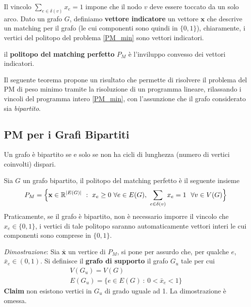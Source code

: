\documentclass[10pt, letterpaper]{report}
\newcommand{\x}{{\mathbf{x}}}
\begin{document}
Il vincolo $\sum_{e\in\delta(v)}x_e=1$ impone che il nodo $v$ deve essere toccato da un solo arco. Dato un grafo $G$, definiamo \textbf{vettore indicatore} un vettore $\x$ che descrive un matching per il grafo (le cui componenti sono quindi in $\{0,1\}$), chiaramente, i vertici del politopo del problema \ref{PM_min} sono vettori indicatori.
\begin{definizione}
    il \textbf{politopo del matching perfetto} $P_M$ è l'inviluppo convesso dei vettori indicatori.
\end{definizione}
Il seguente teorema propone un risultato che permette di risolvere il problema del PM di peso minimo tramite la risoluzione di un programma lineare, rilassando i vincoli del programma intero \ref{PM_min}, con l'assunzione che il grafo considerato sia \textit{bipartito}.
\subsection{PM per i Grafi Bipartiti}
\begin{proposizione}\label{cicli_pari}
    Un grafo è bipartito se e solo se non ha cicli di lunghezza (numero di vertici coinvolti) dispari.
\end{proposizione}
\begin{teorema}
    Sia $G$ un grafo bipartito, il politopo del matching perfetto è il seguente insieme 
    $$ P_M= \Big\{
    \mathbf x \in \R^{|E(G)|} \ : \ x_e\ge0 \  \forall e\in E(G),   \ 
    \sum_{e\in\delta(v)}x_e=1 \ \ \forall v\in V(G) 
    \Big\}$$
    Praticamente, se il grafo è bipartito, non è necessario imporre il vincolo che $x_e\in\{0,1\}$, i vertici di tale politopo saranno automaticamente vettori interi le cui componenti sono comprese in $\{0,1\}$.
\end{teorema}
\textit{Dimostrazione}: Sia $\bar\x$ un vertice di $P_M$, si pone per assurdo che, per qualche $e$, $\bar x_e\in (0,1)$. Si definisce il \textbf{grafo di supporto} il grafo $G_u$ tale per cui \begin{eqnarray*}
    V(G_u)=V(G)\\
    E(G_u)=\{e\in E(G) \ : \ 0<\bar x_e<1\} 
\end{eqnarray*}
\textbf{Claim} non esistono vertici in $G_u$ di grado uguale ad 1. La dimostrazione è omessa.\bigskip
\end{document}
